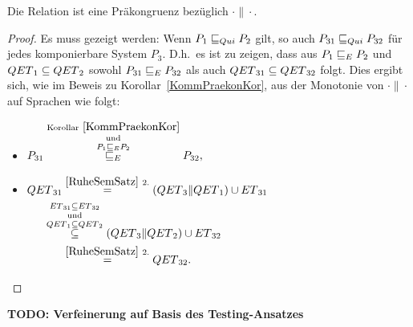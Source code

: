 \begin{Kor}
  \label{RuhePraekonKor}
  Die Relation \QRel{} ist eine Präkongruenz bezüglich $\cdot\|\cdot$.
\end{Kor}
\begin{proof}
  Es muss gezeigt werden: Wenn $P_1 \sqsubseteq  _{Qui} P_2$ gilt, so auch $P_{31} \sqsubseteq  _{Qui}
  P_{32}$ für jedes komponierbare System $P_3$. D.h.\ es ist zu zeigen, dass
  aus $P_1 \sqsubseteq  _E P_2$ und $QET{}_1\subseteq QET{}_2$ sowohl $P_{31} \sqsubseteq  _E
  P_{32}$ als auch $QET{}_{31}\subseteq QET{}_{32}$ folgt. Dies ergibt sich,
  wie im Beweis zu Korollar~\ref{KommPraekonKor}, aus der Monotonie von
  $\cdot\|\cdot$ auf Sprachen wie folgt:
  \begin{itemize}
    \item $\begin{aligned}[t]
        P_{31} \overset{\mathrm{Korollar}~\ref{KommPraekonKor}}{
          \overset{\mathrm{und}}{\overset{P_1 \sqsubseteq  _E P_2}{ \sqsubseteq  _E}}}
        P_{32},
    \end{aligned}$
    \item $\begin{aligned}[t]
        \QET{}_{31} &\overset{\ref{RuheSemSatz}~2.}{=}
        (\QET{}_3\|\QET{}_1)\cup \ET{}_{31}\\
        &\hspace{-0.6cm}\overset{\ET{}_{31}\subseteq
      \ET{}_{32}}{\overset{\mathrm{und}}{\overset{\QET{}_1\subseteq
      \QET{}_2}{\subseteq}}} (\QET{}_3\|\QET{}_2) \cup \ET{}_{32}\\
        &\overset{\ref{RuheSemSatz}~2.}{=} \QET{}_{32}.
    \end{aligned}$
  \vspace*{-0.7cm}
  \end{itemize}
\end{proof}

\textbf{TODO: Verfeinerung auf Basis des Testing-Ansatzes}


